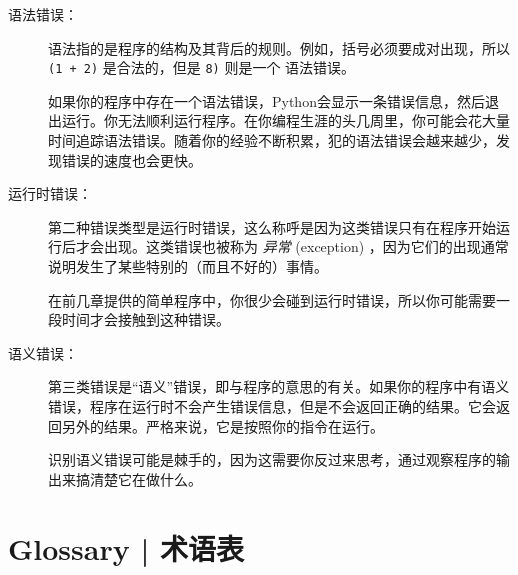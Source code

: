 \begin{description}

\item[语法错误：] 语法指的是程序的结构及其背后的规则。例如，括号必须要成对出现，所以 \lstinline{(1 + 2)} 是合法的，但是 \lstinline{8)} 则是一个 语法错误。

如果你的程序中存在一个语法错误，Python会显示一条错误信息，然后退出运行。你无法顺利运行程序。在你编程生涯的头几周里，你可能会花大量时间追踪语法错误。随着你的经验不断积累，犯的语法错误会越来越少，发现错误的速度也会更快。


\item[运行时错误：] 第二种错误类型是运行时错误，这么称呼是因为这类错误只有在程序开始运行后才会出现。这类错误也被称为 \emph{异常} (exception) ，因为它们的出现通常说明发生了某些特别的（而且不好的）事情。
   
    

在前几章提供的简单程序中，你很少会碰到运行时错误，所以你可能需要一段时间才会接触到这种错误。




\item[语义错误：] 第三类错误是“语义”错误，即与程序的意思的有关。如果你的程序中有语义错误，程序在运行时不会产生错误信息，但是不会返回正确的结果。它会返回另外的结果。严格来说，它是按照你的指令在运行。
      

识别语义错误可能是棘手的，因为这需要你反过来思考，通过观察程序的输出来搞清楚它在做什么。

\end{description}



\section{Glossary  |  术语表}

